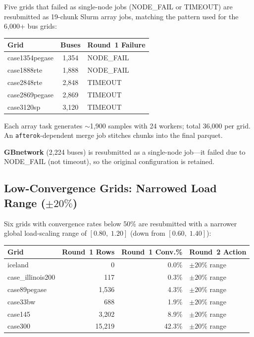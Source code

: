 \documentclass{article}
\begin{document}
Five grids that failed as single-node jobs (NODE\_FAIL or TIMEOUT) are
resubmitted as 19-chunk Slurm array jobs, matching the pattern used for the
6{,}000+ bus grids:

\begin{center}
\begin{tabular}{l c l}
\toprule
\textbf{Grid} & \textbf{Buses} & \textbf{Round~1 Failure} \\
\midrule
case1354pegase & 1{,}354 & NODE\_FAIL \\
case1888rte    & 1{,}888 & NODE\_FAIL \\
case2848rte    & 2{,}848 & TIMEOUT \\
case2869pegase & 2{,}869 & TIMEOUT \\
case3120sp     & 3{,}120 & TIMEOUT \\
\bottomrule
\end{tabular}
\end{center}

Each array task generates $\sim$1{,}900 samples with 24 workers; total 36{,}000
per grid. An \texttt{afterok}-dependent merge job stitches chunks into the final
parquet.

\textbf{GBnetwork} (2{,}224 buses) is resubmitted as a single-node job---it
failed due to NODE\_FAIL (not timeout), so the original configuration is
retained.


\subsection{Low-Convergence Grids: Narrowed Load Range ($\pm20\%$)}

Six grids with convergence rates below 50\% are resubmitted with a narrower
global load-scaling range of $[0.80,\; 1.20]$ (down from $[0.60,\; 1.40]$):

\begin{center}
\begin{tabular}{l r r l}
\toprule
\textbf{Grid} & \textbf{Round~1 Rows} & \textbf{Round~1 Conv.\%} & \textbf{Round~2 Action} \\
\midrule
iceland          & 0        & 0.0\%  & $\pm20\%$ range \\
case\_illinois200 & 117     & 0.3\%  & $\pm20\%$ range \\
case89pegase     & 1{,}536  & 4.3\%  & $\pm20\%$ range \\
case33bw         & 688      & 1.9\%  & $\pm20\%$ range \\
case145          & 3{,}202  & 8.9\%  & $\pm20\%$ range \\
case300          & 15{,}219 & 42.3\% & $\pm20\%$ range \\
\bottomrule
\end{tabular}
\end{center}
\end{document}
